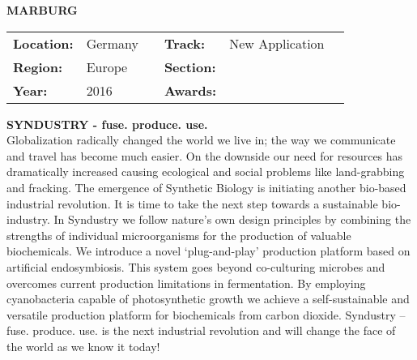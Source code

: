 \textbf{\uppercase{Marburg}} \FloatBarrier \begin{table}[h] \begin{tabular}{lp{2.5cm}llll} \textbf{Location:} & Germany & \multicolumn{1}{|l}{} & \textbf{Track:}   & New Application \\ \textbf{Region:}   & Europe   & \multicolumn{1}{|l}{} & \textbf{Section:} &  \\ \textbf{Year:}     & 2016   & \multicolumn{1}{|l}{} & \textbf{Awards:}  & \end{tabular} \end{table} \FloatBarrier \noindent\textbf{SYNDUSTRY - fuse. produce. use.} \vspace{.2cm}\\ 
Globalization radically changed the world we live in; the way we communicate and travel has become much easier. On the downside our need for resources has dramatically increased causing ecological and social problems like land-grabbing and fracking. The emergence of Synthetic Biology is initiating another bio-based industrial revolution. It is time to take the next step towards a sustainable bio-industry. In Syndustry we follow nature’s own design principles by combining the strengths of individual microorganisms for the production of valuable biochemicals. We introduce a novel ‘plug-and-play’ production platform based on artificial endosymbiosis. This system goes beyond co-culturing microbes and overcomes current production limitations in fermentation. By employing cyanobacteria capable of photosynthetic growth we achieve a self-sustainable and versatile production platform for biochemicals from carbon dioxide. Syndustry – fuse. produce. use. is the next industrial revolution and will change the face of the world as we know it today!
\vspace{2cm} $ $
\pagebreak

